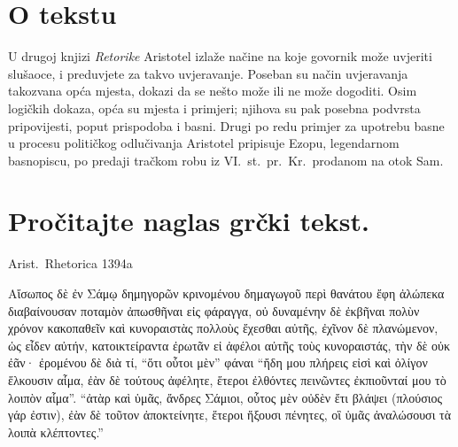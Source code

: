 
\section*{O tekstu}

U drugoj knjizi \textit{Retorike} Aristotel izlaže načine na koje govornik može uvjeriti slušaoce, i preduvjete za takvo uvjeravanje. Poseban su način uvjeravanja takozvana opća mjesta, dokazi da se nešto može ili ne može dogoditi. Osim logičkih dokaza, opća su mjesta i primjeri; njihova su pak posebna podvrsta pripovijesti, poput prispodoba i basni. Drugi po redu primjer za upotrebu basne u procesu političkog odlučivanja Aristotel pripisuje Ezopu, legendarnom basnopiscu, po predaji tračkom robu iz VI.~st.\ pr.~Kr.\ prodanom na otok Sam.


\section*{Pročitajte naglas grčki tekst.}

Arist.\ Rhetorica 1394a
\medskip

{\large
\begin{greek}
\noindent Αἴσωπος δὲ ἐν Σάμῳ δημηγορῶν κρινομένου δημαγωγοῦ περὶ θανάτου ἔφη ἀλώπεκα διαβαίνουσαν ποταμὸν ἀπωσθῆναι εἰς φάραγγα, οὐ δυναμένην δὲ ἐκβῆναι πολὺν χρόνον κακοπαθεῖν καὶ κυνοραιστὰς πολλοὺς ἔχεσθαι αὐτῆς, ἐχῖνον δὲ πλανώμενον, ὡς εἶδεν αὐτήν, κατοικτείραντα ἐρωτᾶν εἰ ἀφέλοι αὐτῆς τοὺς κυνοραιστάς, τὴν δὲ οὐκ ἐᾶν· ἐρομένου δὲ διὰ τί, ``ὅτι οὗτοι μὲν'' φάναι ``ἤδη μου πλήρεις εἰσὶ καὶ ὀλίγον ἕλκουσιν αἷμα, ἐὰν δὲ τούτους ἀφέλητε, ἕτεροι ἐλθόντες πεινῶντες ἐκπιοῦνταί μου τὸ λοιπὸν αἷμα''. ``ἀτὰρ καὶ ὑμᾶς, ἄνδρες Σάμιοι, οὗτος μὲν οὐδὲν ἔτι βλάψει (πλούσιος γάρ ἐστιν), ἐὰν δὲ τοῦτον ἀποκτείνητε, ἕτεροι ἥξουσι πένητες, οἳ ὑμᾶς ἀναλώσουσι τὰ λοιπὰ κλέπτοντες.''

\end{greek}
}

